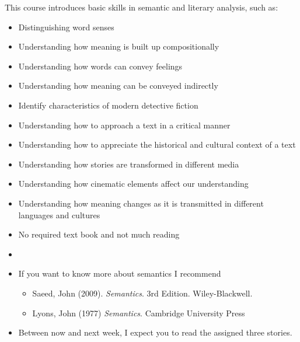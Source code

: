 \documentclass[a4paper,landscape,headrule,footrule,xetex,25pt]{foils}
\begin{document}
This course introduces basic skills in semantic and literary analysis, such as:
\begin{itemize}
\item   Distinguishing word senses
\item   Understanding how meaning is built up compositionally
\item   Understanding how words can convey feelings
\item   Understanding how meaning can be conveyed indirectly
\newpage
\item   Identify characteristics of modern detective fiction
\item   Understanding how to approach a text in a critical manner
\item   Understanding how to appreciate the historical and cultural context of a text
\item   Understanding how stories are transformed in different media
\item   Understanding how cinematic elements affect our understanding
\item   Understanding how meaning changes as it is transmitted in different languages and cultures 
\end{itemize}





\begin{itemize}
\item No required text book and not much reading
\item{}
\item If you want to know more about semantics I recommend
  \begin{itemize}
  \item Saeed, John (2009). \textit{Semantics}. 3rd Edition. Wiley-Blackwell. 
  \item Lyons, John (1977) \textit{Semantics}.  Cambridge University Press
  \end{itemize}
\item Between now and next week, I expect you to read the assigned three stories.
\end{itemize}

\end{document}
